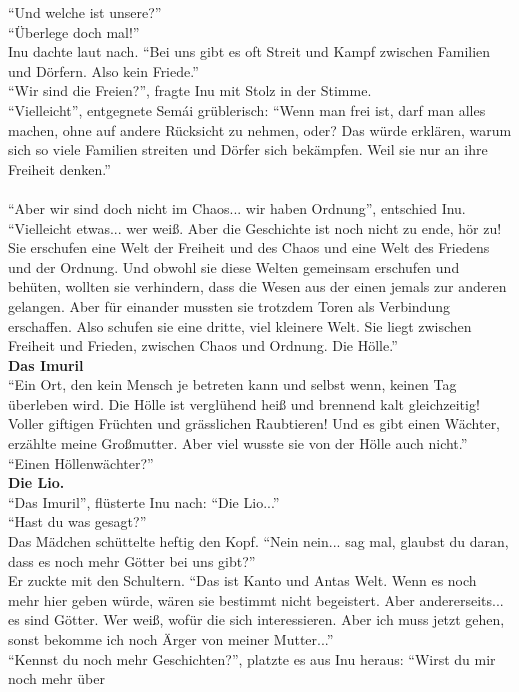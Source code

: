 \documentclass[a4paper,12pt]{book}
\begin{document}
``Und welche ist unsere?''\\
``Überlege doch mal!''\\
Inu dachte laut nach. ``Bei uns gibt es oft Streit und Kampf zwischen Familien und Dörfern. Also 
kein Friede.''\\
``Wir sind die Freien?'', fragte Inu mit Stolz in der Stimme.\\
``Vielleicht'', entgegnete Semái grüblerisch: ``Wenn man frei ist, darf man alles machen, ohne auf 
andere Rücksicht zu nehmen, oder? Das würde erklären, warum sich so viele Familien streiten und 
Dörfer sich bekämpfen. Weil sie nur an ihre Freiheit denken.''\\\\
``Aber wir sind doch nicht im Chaos... wir haben Ordnung'', entschied Inu.
``Vielleicht etwas... wer weiß. Aber die Geschichte ist noch nicht zu ende, hör zu! Sie erschufen 
eine Welt der Freiheit und des Chaos und eine Welt des Friedens und der Ordnung. Und obwohl sie 
diese Welten gemeinsam erschufen und behüten, wollten sie verhindern, dass die Wesen aus der einen 
jemals zur anderen gelangen. Aber für einander mussten sie trotzdem Toren als Verbindung 
erschaffen. Also schufen sie eine dritte, viel kleinere Welt. Sie liegt zwischen Freiheit und 
Frieden, zwischen Chaos und Ordnung. Die Hölle.''\\
\textbf{Das Imuril}\\
``Ein Ort, den kein Mensch je betreten kann und selbst wenn, keinen Tag überleben wird. Die Hölle 
ist verglühend heiß und brennend kalt gleichzeitig! Voller giftigen Früchten und grässlichen 
Raubtieren! Und es gibt einen Wächter, erzählte meine Großmutter. Aber viel wusste sie von der 
Hölle auch nicht.''\\
``Einen Höllenwächter?''\\
\textbf{Die Lio.}\\
``Das Imuril'', flüsterte Inu nach: ``Die Lio...''\\
``Hast du was gesagt?''\\
Das Mädchen schüttelte heftig den Kopf. ``Nein nein... sag mal, glaubst du daran, dass es noch mehr 
Götter bei uns gibt?''\\
Er zuckte mit den Schultern. ``Das ist Kanto und Antas Welt. Wenn es noch mehr hier geben würde, 
wären sie bestimmt nicht begeistert. Aber andererseits... es sind Götter. Wer weiß, wofür die sich 
interessieren. Aber ich muss jetzt gehen, sonst bekomme ich noch Ärger von meiner Mutter...''\\
``Kennst du noch mehr Geschichten?'', platzte es aus Inu heraus: ``Wirst du mir noch mehr über 
\end{document}
